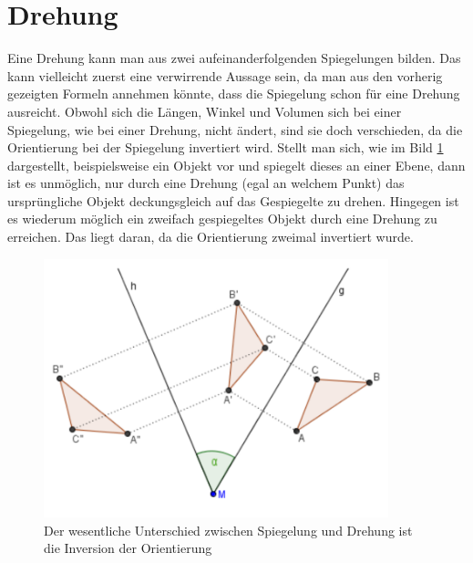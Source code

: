 %
%
%
\section{Drehung}

Eine Drehung kann man aus zwei aufeinanderfolgenden Spiegelungen bilden. Das kann vielleicht zuerst eine verwirrende Aussage sein, da man aus den vorherig gezeigten Formeln annehmen könnte, dass die Spiegelung schon für eine Drehung ausreicht. Obwohl sich die Längen, Winkel und Volumen sich bei einer Spiegelung, wie bei einer Drehung, nicht ändert, sind sie doch verschieden, da die Orientierung bei der Spiegelung invertiert wird. Stellt man sich, wie im Bild \ref{BildSpiegRot} dargestellt, beispielsweise ein Objekt vor und spiegelt dieses an einer Ebene, dann ist es unmöglich, nur durch eine Drehung (egal an welchem Punkt) das ursprüngliche Objekt deckungsgleich auf das Gespiegelte zu drehen. Hingegen ist es wiederum möglich ein zweifach gespiegeltes Objekt durch eine Drehung zu erreichen. Das liegt daran, da die Orientierung zweimal invertiert wurde.

\begin{figure}
	\centering
	\includegraphics[width=10cm]{papers/clifford/Bilder/RotSpieg.png}
	\caption{Der wesentliche Unterschied zwischen Spiegelung und Drehung ist die Inversion der Orientierung}
	\label{BildSpiegRot}
\end{figure}

